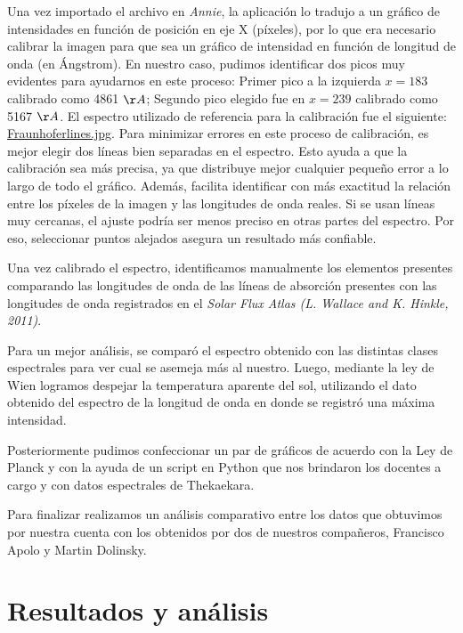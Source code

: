 \documentclass[11pt, a4paper]{article}
\begin{document}
Una vez importado el archivo en \textit{Annie}, la aplicación lo tradujo a un gráfico de intensidades en función de posición en eje X (píxeles), por lo que era necesario calibrar la imagen para que sea un gráfico de intensidad en función de longitud de onda (en Ángstrom). En nuestro caso, pudimos identificar dos picos muy evidentes para ayudarnos en este proceso: Primer pico a la izquierda $x=183$ calibrado como 4861 $\AA$; Segundo pico elegido fue en $x=239$ calibrado como 5167 $\AA$. El espectro utilizado de referencia para la calibración fue el siguiente: \href{https://jazzistentialism.com/blog/wp-content/uploads/2014/05/fraunhoferlines.jpg}{Fraunhoferlines.jpg}. Para minimizar errores en este proceso de calibración, es mejor elegir dos líneas bien separadas en el espectro. Esto ayuda a que la calibración sea más precisa, ya que distribuye mejor cualquier pequeño error a lo largo de todo el gráfico. Además, facilita identificar con más exactitud la relación entre los píxeles de la imagen y las longitudes de onda reales. Si se usan líneas muy cercanas, el ajuste podría ser menos preciso en otras partes del espectro. Por eso, seleccionar puntos alejados asegura un resultado más confiable.

Una vez calibrado el espectro, identificamos manualmente los elementos presentes comparando las longitudes de onda de las líneas de absorción presentes con las longitudes de onda registrados en el \textit{Solar Flux Atlas (L. Wallace and K. Hinkle, 2011)}.

Para un mejor análisis, se comparó el espectro obtenido con las distintas clases espectrales para ver cual se asemeja más al nuestro. Luego, mediante la ley de Wien logramos despejar la temperatura aparente del sol, utilizando el dato obtenido del espectro de la longitud de onda en donde se registró una máxima intensidad. 

Posteriormente pudimos confeccionar un par de gráficos de acuerdo con la Ley de Planck y con la ayuda de un script en Python que nos brindaron los docentes a cargo y con datos espectrales de Thekaekara. 

Para finalizar realizamos un análisis comparativo entre los datos que obtuvimos por nuestra cuenta con los obtenidos por dos de nuestros compañeros, Francisco Apolo y Martin Dolinsky.

\section{Resultados y análisis}
\end{document}
